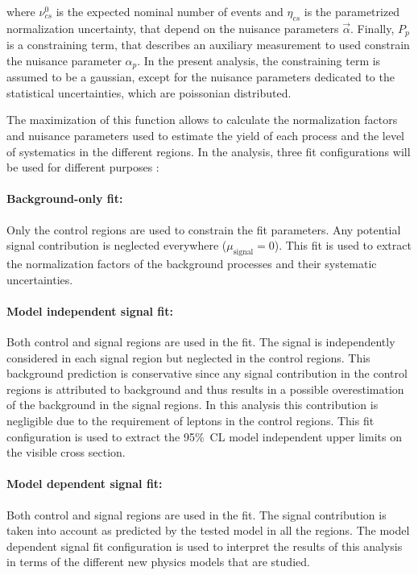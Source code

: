 \noindent where $\nu^0_{cs}$ is the expected nominal number of events and $\eta_{cs}$ is the parametrized normalization uncertainty, that depend on the nuisance parameters $\vec{\alpha}$.
Finally, $P_p$ is a constraining term, that describes an auxiliary measurement to used constrain the nuisance parameter $\alpha_p$.
In the present analysis, the constraining term is assumed to be a gaussian, except for the nuisance parameters dedicated to the statistical uncertainties, which are poissonian distributed.

The maximization of this function allows to calculate the normalization factors and nuisance parameters used to estimate the yield of each process and the level of systematics in the different regions.
In the analysis, three fit configurations will be used for different purposes \cite{Baak:2014wma}:

\paragraph{Background-only fit:}Only the control regions are used to constrain the fit parameters. 
Any potential signal contribution is neglected everywhere ($\mu_\text{signal} = 0$).
This fit is used to extract the normalization factors of the background processes and their systematic uncertainties.

\paragraph{Model independent signal fit:}Both control and signal regions are used in the fit. 
The signal is independently considered in each signal region but neglected in the control regions.
This background prediction is conservative since any signal contribution in the control regions is attributed to background and thus results in a possible overestimation of the background in the signal regions. 
In this analysis this contribution is negligible due to the requirement of leptons in the control regions.
This fit configuration is used to extract the 95\%~CL model independent upper limits on the visible cross section.

\paragraph{Model dependent signal fit:}Both control and signal regions are used in the fit. 
The signal contribution is taken into account as predicted by the tested model in all the regions.
The model dependent signal fit configuration is used to interpret the results of this analysis in terms of the different new physics models that are studied.


